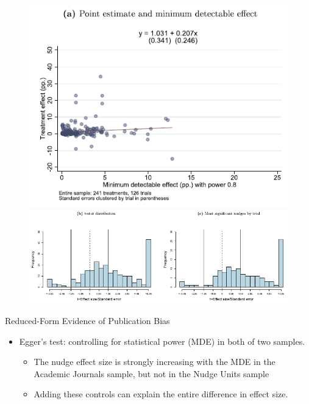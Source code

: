 \documentclass[dvipdfmx,11pt]{beamer}
\begin{document}
\begin{frame}{}
  \begin{figure}
    \centering
    \includegraphics[scale = .45]{fig_tab/os20220412/F6a.png}
    \includegraphics[scale = .5]{fig_tab/os20220412/F6bc.png}
  \end{figure}
\end{frame}

\begin{frame}{Reduced-Form Evidence of Publication Bias}
  \begin{itemize}
    \item Egger's test: controlling for statistical power (MDE) in both of two samples.
    \begin{itemize}
      \item The nudge
      effect size is strongly increasing with the MDE in the Academic Journals sample, but not in the Nudge Units sample
      \item Adding these controls can explain the entire difference in effect size.
    \end{itemize}
  \end{itemize}
\end{frame}
\end{document}
